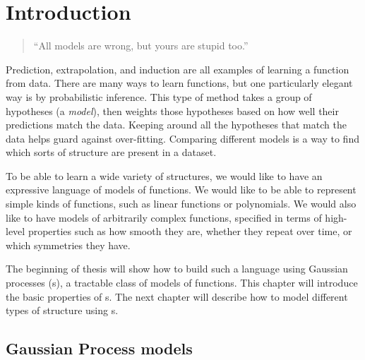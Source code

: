 
\inbpdocument

\chapter{Introduction}
\label{ch:intro}




\begin{quotation}
``All models are wrong, but yours are stupid too.'' \\
\hspace*{\fill} \citet{mlhipster}
\end{quotation}

Prediction, extrapolation, and induction are all examples of learning a function from data.
There are many ways to learn functions, but one particularly elegant way is by probabilistic inference.
This type of method takes a group of hypotheses (a \emph{model}), then weights those hypotheses based on how well their predictions match the data.
Keeping around all the hypotheses that match the data helps guard against over-fitting.
Comparing different models is a way to find which sorts of structure are present in a dataset.

To be able to learn a wide variety of structures, we would like to have an expressive language of models of functions.
We would like to be able to represent simple kinds of functions, such as linear functions or polynomials.
We would also like to have models of arbitrarily complex functions, specified in terms of high-level properties such as how smooth they are, whether they repeat over time, or which symmetries they have.

The beginning of thesis will show how to build such a language using Gaussian processes (\gp{}s), a tractable class of models of functions.
This chapter will introduce the basic properties of \gp{}s.
The next chapter will describe how to model different types of structure using \gp{}s.




\section{Gaussian Process models}

